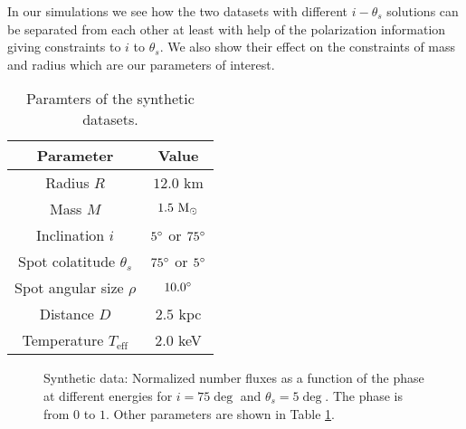\documentclass{wihuri}
\def\msun{{\rm M_{\odot}}}
\def\thetas{\theta_{s}}
\begin{document}



In our simulations we see how the two datasets with different $i-\thetas$ solutions can be separated from each other at least with help of the polarization information giving constraints to $i$ to $\thetas$. We also show their effect on the constraints of mass and radius which are our parameters of interest. 




\begin{center}
\begin{table}
  \caption{Paramters of the synthetic datasets.}
\label{table:params}
\begin{center}
  \begin{tabular}{| c | c |}
    \hline
     Parameter & Value\\ \hline
      Radius $R$ & $12.0$ km  \\ \hline
      Mass $M$ & $1.5 ~\msun$  \\ \hline
      Inclination $i$ & $5 \degree$ or $75 \degree$ \\ \hline
      Spot colatitude $\thetas$ & $75 \degree$ or $5 \degree$ \\ \hline
      Spot angular size $\rho$ & $10.0 \degree$  \\ \hline
      Distance $D$ & $2.5$ kpc \\ \hline
      Temperature $T_{\mathrm{eff}}$ & $2.0$ keV \\

    \hline
  \end{tabular}
  \end{center} 

  \end{table}
\end{center} 



%



\begin{figure}
\centerline{}
\caption{Synthetic data: Normalized number fluxes as a function of the phase at different energies for $i = 75 \deg$ and $\thetas = 5 \deg$. The phase is from $0$ to $1$. Other parameters are shown in Table \ref{table:params}.
\label{fig:syntpol2}}
\end{figure}
\end{document}
